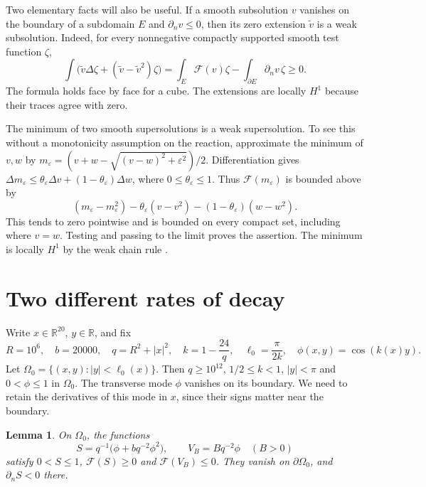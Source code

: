 \documentclass[11pt]{article}
\newtheorem{lemma}[theorem]{Lemma}
\newcommand{\R}{\mathbb R}
\newcommand{\Om}{\Omega}
\newcommand{\F}{\mathcal F}
\begin{document}
Two elementary facts will also be useful. If a smooth subsolution $v$ vanishes
on the boundary of a subdomain $E$ and $\partial_n v\leq0$, then its zero
extension $\widetilde v$ is a weak subsolution. Indeed, for every nonnegative
compactly supported smooth test function $\zeta$,
\begin{equation}\label{eq:extension}
 \int\bigl(\widetilde v\Delta\zeta+
              (\widetilde v-\widetilde v^2)\zeta\bigr)
 =\int_E\F(v)\zeta-\int_{\partial E}\partial_n v\,\zeta\geq0.
\end{equation}
The formula holds face by face for a cube. The extensions are locally $H^1$
because their traces agree with zero.

The minimum of two smooth supersolutions is a weak supersolution. To see
this without a monotonicity assumption on the reaction, approximate the
minimum of $v,w$ by
$m_\varepsilon=(v+w-\sqrt{(v-w)^2+\varepsilon^2})/2$.
Differentiation gives
$\Delta m_\varepsilon\leq\theta_\varepsilon\Delta v+
(1-\theta_\varepsilon)\Delta w$, where $0\leq\theta_\varepsilon\leq1$.
Thus $\F(m_\varepsilon)$ is bounded above by
\[
 (m_\varepsilon-m_\varepsilon^2)
 -\theta_\varepsilon(v-v^2)-(1-\theta_\varepsilon)(w-w^2).
\]
This tends to zero pointwise and is bounded on every compact set, including
where $v=w$. Testing and passing to the limit proves the assertion.
The minimum is locally $H^1$ by the weak chain rule
\cite[Section~7.4 and pp.~153--154]{GT}.

\section{Two different rates of decay}

Write $x\in\R^{20}$, $y\in\R$, and fix
\begin{equation}\label{eq:geometry}
 R=10^6,\quad b=20000,\quad q=R^2+|x|^2,\quad
 k=1-\frac{24}{q},\quad \ell_0=\frac{\pi}{2k},\quad
 \phi(x,y)=\cos(k(x)y).
\end{equation}
Let $\Om_0=\{(x,y):|y|<\ell_0(x)\}$. Then $q\geq10^{12}$,
$1/2\leq k<1$, $|y|<\pi$ and $0<\phi\leq1$ in $\Om_0$.
The transverse mode $\phi$ vanishes on its boundary. We need to retain the
derivatives of this mode in $x$, since their signs matter near the boundary.

\begin{lemma}\label{lem:barriers}
On $\Om_0$, the functions
\[
 S=q^{-1}\bigl(\phi+bq^{-2}\phi^2\bigr),\qquad
 V_B=Bq^{-2}\phi\quad(B>0)
\]
satisfy $0<S\leq1$, $\F(S)\geq0$ and $\F(V_B)\leq0$.
They vanish on $\partial\Om_0$, and $\partial_nS<0$ there.
\end{lemma}
\end{document}
